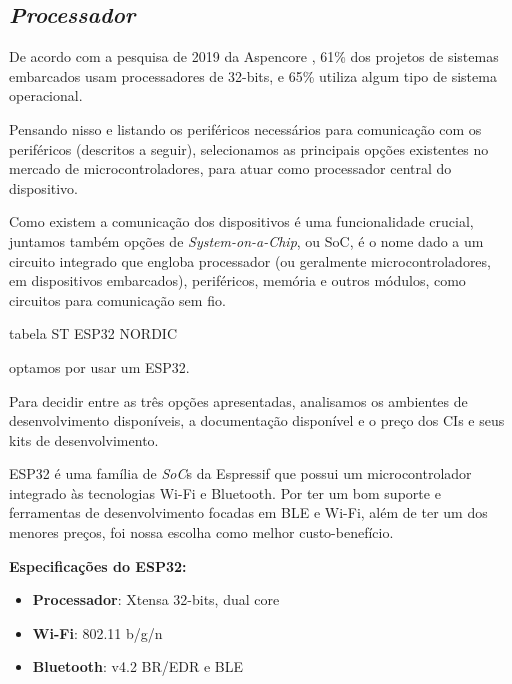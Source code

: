 \documentclass[../monografia.tex]{subfiles}
\begin{document}
\subsection{\textit{Processador}}

De acordo com a pesquisa de 2019 da Aspencore \cite{eetimes}, 61\% dos projetos de sistemas embarcados usam processadores de 32-bits, e 65\% utiliza algum tipo de sistema operacional. 

Pensando nisso e listando os periféricos necessários para comunicação com os periféricos (descritos a seguir), selecionamos as principais opções existentes no mercado de microcontroladores, para atuar como processador central do dispositivo. 

Como existem a comunicação dos dispositivos é uma funcionalidade crucial, juntamos também opções de \textit{System-on-a-Chip}, ou SoC, é o nome dado a um circuito integrado que engloba processador (ou geralmente microcontroladores, em dispositivos embarcados), periféricos, memória e outros módulos, como circuitos para comunicação sem fio.

tabela
ST
ESP32
NORDIC

optamos por usar um ESP32. 

Para decidir entre as três opções apresentadas, analisamos os ambientes de desenvolvimento disponíveis, a documentação disponível e o preço dos CIs e seus kits de desenvolvimento. 

ESP32\cite{ESP32} é uma família de \textit{SoC}s da Espressif que possui um microcontrolador integrado às tecnologias Wi-Fi e Bluetooth. Por ter um bom suporte e ferramentas de desenvolvimento focadas em BLE e Wi-Fi, além de ter um dos menores preços, foi nossa escolha como melhor custo-benefício. 



 

\textbf{Especificações do ESP32:} \cite{ESP-datasheet}
\begin{itemize}
\item \textbf{Processador}: Xtensa 32-bits, dual core
\item \textbf{Wi-Fi}: 802.11 b/g/n
\item \textbf{Bluetooth}: v4.2 BR/EDR e BLE
\end{itemize}
\end{document}
